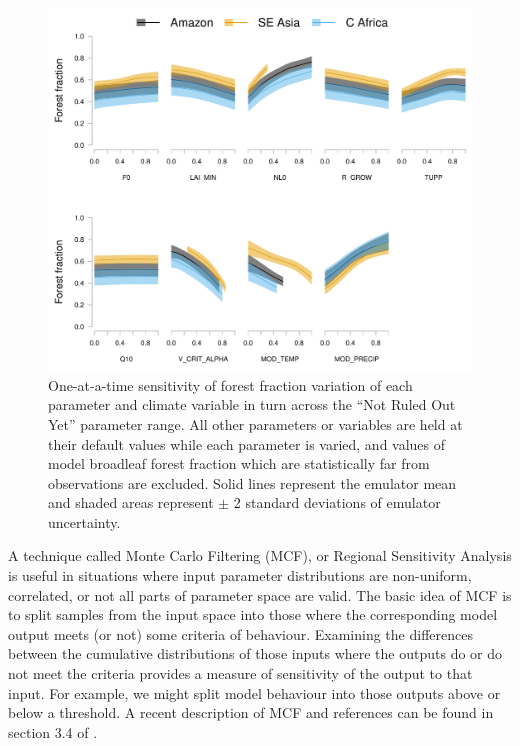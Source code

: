 \documentclass[gmd, manuscript]{copernicus}
\begin{document}
\begin{figure}[t]
\includegraphics[width=12cm]{../graphics/sensitivity_TP_no_NROY.pdf}
\caption{One-at-a-time sensitivity of forest fraction variation of each parameter and climate variable in turn across the ``Not Ruled Out Yet'' parameter range. All other parameters or variables are held at their default values while each parameter is varied, and values of model broadleaf forest fraction which are statistically far from observations are excluded. Solid lines represent the emulator mean and shaded areas represent $\pm$ 2 standard deviations of emulator uncertainty.
}
\label{fig:sensitivity_TP_no_NROY}
\end{figure}

A technique called Monte Carlo Filtering (MCF), or Regional Sensitivity Analysis is useful in situations where input parameter distributions are non-uniform, correlated, or not all parts of parameter space are valid.  The basic idea of MCF is to split samples from the input space into those where the corresponding model output meets (or not) some criteria of behaviour. Examining the differences between the cumulative distributions of those inputs where the outputs do or do not meet the criteria provides a measure of sensitivity of the output to that input. For example, we might split model behaviour into those outputs above or below a threshold. A recent description of MCF and references can be found in section 3.4 of \cite{pianosi2016sensitivity}.
\end{document}
